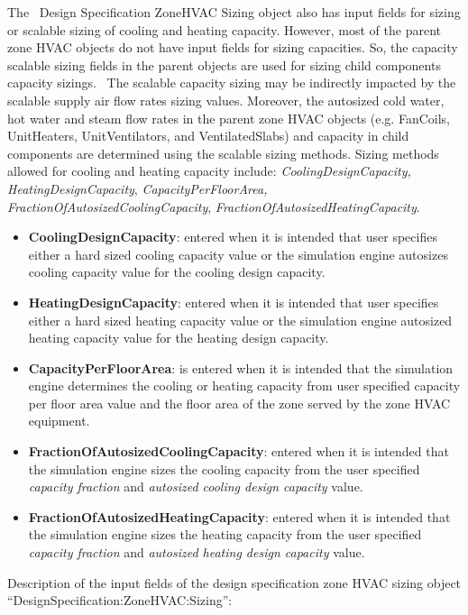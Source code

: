 The~ Design Specification ZoneHVAC Sizing object also has input fields for sizing or scalable sizing of cooling and heating capacity. However, most of the parent zone HVAC objects do not have input fields for sizing capacities. So, the capacity scalable sizing fields in the parent objects are used for sizing child components capacity sizings.~ The scalable capacity sizing may be indirectly impacted by the scalable supply air flow rates sizing values. Moreover, the autosized cold water, hot water and steam flow rates in the parent zone HVAC objects (e.g. FanCoils, UnitHeaters, UnitVentilators, and VentilatedSlabs) and capacity in child components are determined using the scalable sizing methods. Sizing methods allowed for cooling and heating capacity include: \emph{CoolingDesignCapacity, HeatingDesignCapacity}, \emph{CapacityPerFloorArea, FractionOfAutosizedCoolingCapacity}, \emph{FractionOfAutosizedHeatingCapacity}.

\begin{itemize}
\item
  \textbf{CoolingDesignCapacity}: entered when it is intended that user specifies either a hard sized cooling capacity value or the simulation engine autosizes cooling capacity value for the cooling design capacity.
\item
  \textbf{HeatingDesignCapacity}: entered when it is intended that user specifies either a hard sized heating capacity value or the simulation engine autosized heating capacity value for the heating design capacity.
\item
  \textbf{CapacityPerFloorArea}: is entered when it is intended that the simulation engine determines the cooling or heating capacity from user specified capacity per floor area value and the floor area of the zone served by the zone HVAC equipment.
\item
  \textbf{FractionOfAutosizedCoolingCapacity}: entered when it is intended that the simulation engine sizes the cooling capacity from the user specified \emph{capacity fraction} and \emph{autosized cooling design capacity} value.
\item
  \textbf{FractionOfAutosizedHeatingCapacity}: entered when it is intended that the simulation engine sizes the heating capacity from the user specified \emph{capacity fraction} and \emph{autosized heating design capacity} value.
\end{itemize}

Description of the input fields of the design specification zone HVAC sizing object ``DesignSpecification:ZoneHVAC:Sizing'':

